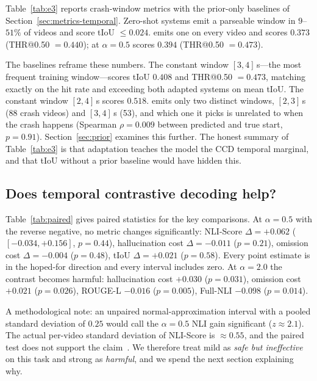 Table~\ref{tab:e3} reports crash-window metrics with the prior-only baselines of Section~\ref{sec:metrics-temporal}.
Zero-shot systems emit a parseable window in $9$--$51\%$ of videos and score tIoU $\leq0.024$.
\crashlogic{} emits one on every video and scores $0.373$ (THR@0.50 $=0.440$); \tcd{} at $\alpha{=}0.5$ scores $0.394$ (THR@0.50 $=0.473$).



The baselines reframe these numbers.
The constant window $[3,4]$\,s---the most frequent training window---scores tIoU $0.408$ and THR@0.50 $=0.473$, matching \tcd{} exactly on the hit rate and exceeding both adapted systems on mean tIoU.
The constant window $[2,4]$\,s scores $0.518$.
\crashlogic{} emits only two distinct windows, $[2,3]$\,s (88 crash videos) and $[3,4]$\,s (53), and which one it picks is unrelated to when the crash happens (Spearman $\rho{=}0.009$ between predicted and true start, $p{=}0.91$).
Section~\ref{sec:prior} examines this further.
The honest summary of Table~\ref{tab:e3} is that adaptation teaches the model the CCD temporal marginal, and that tIoU without a prior baseline would have hidden this.

\subsection{Does temporal contrastive decoding help?}
\label{sec:tcd-results}

Table~\ref{tab:paired} gives paired statistics for the key comparisons.
At $\alpha{=}0.5$ with the reverse negative, no metric changes significantly: NLI-Score $\Delta{=}{+}0.062$ ($[-0.034,+0.156]$, $p{=}0.44$), hallucination cost $\Delta{=}{-}0.011$ ($p{=}0.21$), omission cost $\Delta{=}{-}0.004$ ($p{=}0.48$), tIoU $\Delta{=}{+}0.021$ ($p{=}0.58$).
Every point estimate is in the hoped-for direction and every interval includes zero.
At $\alpha{=}2.0$ the contrast becomes harmful: hallucination cost $+0.030$ ($p{=}0.031$), omission cost $+0.021$ ($p{=}0.026$), ROUGE-L $-0.016$ ($p{=}0.005$), Full-NLI $-0.098$ ($p{=}0.014$).



A methodological note: an unpaired normal-approximation interval with a pooled standard deviation of $0.25$ would call the $\alpha{=}0.5$ NLI gain significant ($z\approx2.1$).
The actual per-video standard deviation of NLI-Score is $\approx0.55$, and the paired test does not support the claim~\cite{dror2018hitchhiker}.
We therefore treat mild \tcd{} as \emph{safe but ineffective} on this task and strong \tcd{} as \emph{harmful}, and we spend the next section explaining why.
